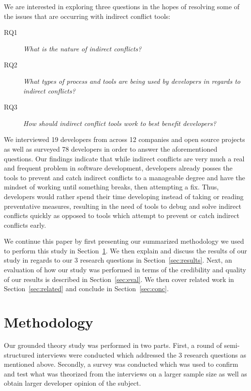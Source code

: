 \documentclass[conference]{IEEEtran}
\makeatletter
\def\namedlabel#1#2{\begingroup
   \def\@currentlabel{#2}%
   \label{#1}\endgroup
}
\makeatother
\begin{document}
We are interested in exploring three questions in the hopes of resolving some of the issues that are occurring
with indirect conflict tools: 

\begin{description}
	\item[RQ1\namedlabel{itm:rq1}{RQ1}] \textit{What is the nature of indirect conflicts?}
	\item[RQ2\namedlabel{itm:rq2}{RQ2}] \textit{What types of process and tools are being used by developers in regards to indirect conflicts?}
	\item[RQ3\namedlabel{itm:rq3}{RQ3}] \textit{How should indirect conflict tools work to best benefit developers?}
\end{description}

We interviewed 19 developers from across 12 companies and open source projects as well as surveyed 78 
developers in order to answer the aforementioned questions. Our findings indicate that while indirect conflicts are very much a real 
and frequent problem
in software development, developers already posses the tools to prevent and catch indirect conflicts to a manageable degree and have
the mindset of working until something breaks, then attempting a fix. Thus, developers would rather spend their time developing instead
of taking or reading preventative measures, resulting in the need of tools to debug and solve indirect conflicts quickly as opposed to tools 
which attempt to prevent or catch indirect conflicts early.

We continue this paper by first presenting our summarized methodology we used to perform this study in Section~\ref{sec:meth}. We
then explain and discuss the results of our study in regards to our 3 research questions in Section~\ref{sec:results}.
Next, an evaluation of how our study was performed in terms of the credibility
and quality of our results is described in Section~\ref{sec:eval}. We then cover related work in Section~\ref{sec:related}
and conclude in Section~\ref{sec:conc}.

\section{Methodology}
\label{sec:meth}

Our grounded theory study was performed in two parts. First, a round of semi-structured interviews were conducted which 
addressed the 3 research questions as mentioned above. Secondly, a survey was conducted
which was used to confirm and test what was theorized from the interviews on a larger sample size as well as obtain
larger developer opinion of the subject.
\end{document}

